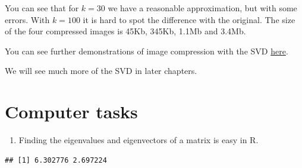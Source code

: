 \documentclass[
]{book}
\newenvironment{Shaded}{\begin{snugshade}}{\end{snugshade}}
\newcommand{\AttributeTok}[1]{\textcolor[rgb]{0.13,0.29,0.53}{#1}}
\newcommand{\CommentTok}[1]{\textcolor[rgb]{0.56,0.35,0.01}{\textit{#1}}}
\newcommand{\ConstantTok}[1]{\textcolor[rgb]{0.56,0.35,0.01}{#1}}
\newcommand{\DecValTok}[1]{\textcolor[rgb]{0.00,0.00,0.81}{#1}}
\newcommand{\FunctionTok}[1]{\textcolor[rgb]{0.13,0.29,0.53}{\textbf{#1}}}
\newcommand{\NormalTok}[1]{#1}
\newcommand{\OtherTok}[1]{\textcolor[rgb]{0.56,0.35,0.01}{#1}}
\newcommand{\SpecialCharTok}[1]{\textcolor[rgb]{0.81,0.36,0.00}{\textbf{#1}}}
\providecommand{\tightlist}{%
  \setlength{\itemsep}{0pt}\setlength{\parskip}{0pt}}
\theoremstyle{definition}
\theoremstyle{definition}
\theoremstyle{definition}
\theoremstyle{definition}
\theoremstyle{remark}
\begin{document}
You can see that for \(k=30\) we have a reasonable approximation, but with some errors. With \(k=100\) it is hard to spot the difference with the original. The size of the four compressed images is 45Kb, 345Kb, 1.1Mb and 3.4Mb.

You can see further demonstrations of image compression with the SVD \href{http://timbaumann.info/svd-image-compression-demo/}{here}.

We will see much more of the SVD in later chapters.

\section{Computer tasks}\label{tasks-ch3}

\begin{enumerate}
\def\labelenumi{\arabic{enumi}.}
\tightlist
\item
  Finding the eigenvalues and eigenvectors of a matrix is easy in R.
\end{enumerate}

\begin{Shaded}
\end{Shaded}

\begin{verbatim}
## [1] 6.302776 2.697224
\end{verbatim}

\begin{Shaded}
\end{Shaded}
\end{document}
